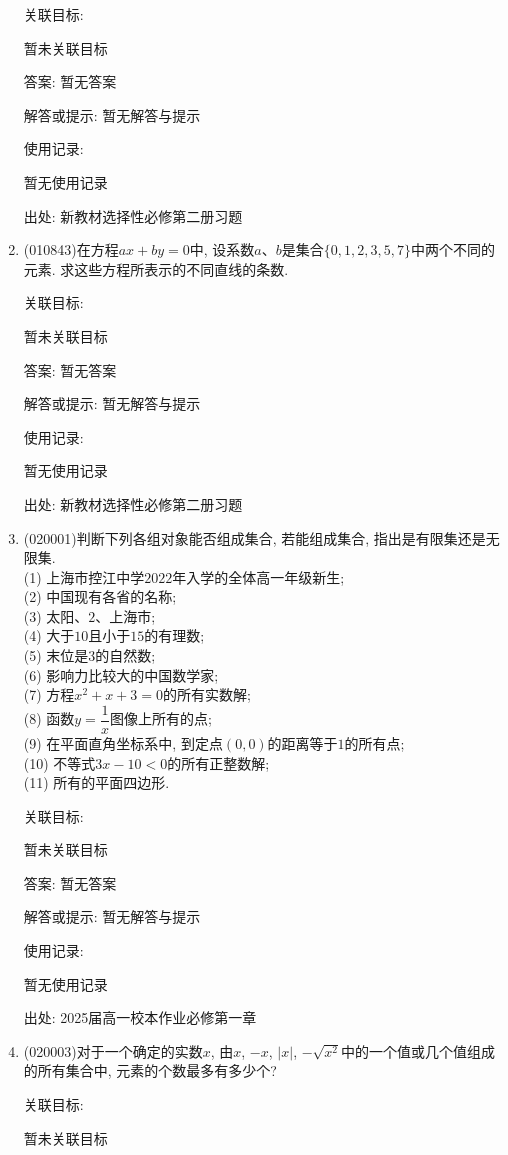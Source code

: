 \documentclass[10pt,a4paper]{article}
\begin{document}
\begin{enumerate}[1.]
关联目标:

暂未关联目标

答案: 暂无答案

解答或提示: 暂无解答与提示

使用记录:

暂无使用记录


出处: 新教材选择性必修第二册习题
\item { (010843)}在方程$ax+by=0$中, 设系数$a$、$b$是集合$\{0, 1, 2, 3, 5, 7\}$中两个不同的元素. 求这些方程所表示的不同直线的条数.


关联目标:

暂未关联目标

答案: 暂无答案

解答或提示: 暂无解答与提示

使用记录:

暂无使用记录


出处: 新教材选择性必修第二册习题
\item { (020001)}判断下列各组对象能否组成集合, 若能组成集合, 指出是有限集还是无限集.\\
(1) 上海市控江中学$2022$年入学的全体高一年级新生;\\
(2) 中国现有各省的名称;\\
(3) 太阳、$2$、上海市;\\
(4) 大于$10$且小于$15$的有理数;\\
(5) 末位是$3$的自然数;\\
(6) 影响力比较大的中国数学家;\\
(7) 方程$x^2+x+3=0$的所有实数解;\\ 
(8) 函数$y=\dfrac 1x$图像上所有的点;\\ 
(9) 在平面直角坐标系中, 到定点$(0, 0)$的距离等于$1$的所有点;\\
(10) 不等式$3x-10<0$的所有正整数解;\\
(11) 所有的平面四边形.


关联目标:

暂未关联目标

答案: 暂无答案

解答或提示: 暂无解答与提示

使用记录:

暂无使用记录


出处: 2025届高一校本作业必修第一章
\item { (020003)}对于一个确定的实数$x$, 由$x$, $-x$, $|x|$, $-\sqrt{x^2}$中的一个值或几个值组成的所有集合中, 元素的个数最多有多少个?


关联目标:

暂未关联目标


\end{enumerate}
\end{document}
